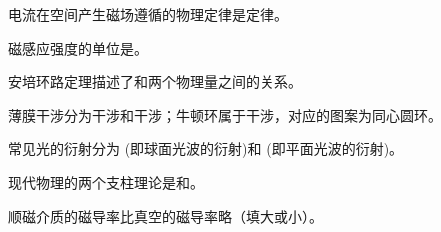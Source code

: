 \documentclass{njustexam}
\begin{document}

\begin{problem}
  电流在空间产生磁场遵循的物理定律是定律。
\end{problem} 

\begin{problem}
磁感应强度的单位是。
\end{problem}


\begin{problem}
  安培环路定理描述了和两个物理量之间的关系。
\end{problem}



\begin{problem}
薄膜干涉分为干涉和干涉；牛顿环属于干涉，对应的图案为同心圆环。
\end{problem}

\begin{problem}
  常见光的衍射分为 (即球面光波的衍射)和 (即平面光波的衍射)。
 \end{problem}

 \begin{problem}
  现代物理的两个支柱理论是和。
\end{problem}




\begin{problem}
  顺磁介质的磁导率比真空的磁导率略（填大或小）。
\end{problem}

\end{document}
